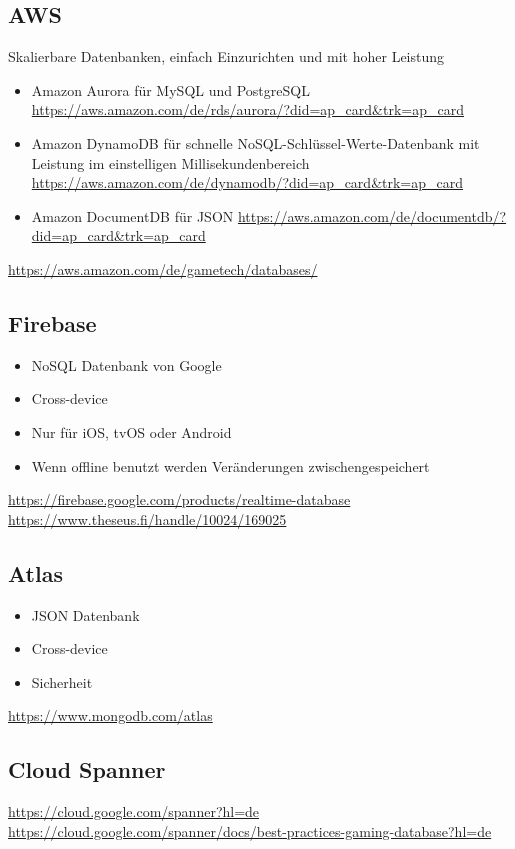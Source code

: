 \subsection{AWS}
Skalierbare Datenbanken, einfach Einzurichten und mit hoher Leistung
\begin{itemize}
    \item Amazon Aurora für MySQL und PostgreSQL \url{https://aws.amazon.com/de/rds/aurora/?did=ap_card&trk=ap_card}
    \item Amazon DynamoDB für schnelle NoSQL-Schlüssel-Werte-Datenbank mit Leistung im einstelligen Millisekundenbereich \url{https://aws.amazon.com/de/dynamodb/?did=ap_card&trk=ap_card}
    \item Amazon DocumentDB für JSON \url{https://aws.amazon.com/de/documentdb/?did=ap_card&trk=ap_card}
\end{itemize}

\url{https://aws.amazon.com/de/gametech/databases/}

\subsection{Firebase}

\begin{itemize}
    \item NoSQL Datenbank von Google
    \item Cross-device
    \item Nur für iOS, tvOS oder Android
    \item Wenn offline benutzt werden Veränderungen zwischengespeichert
\end{itemize}

\url{https://firebase.google.com/products/realtime-database}\\
\url{https://www.theseus.fi/handle/10024/169025}

\subsection{Atlas}

\begin{itemize}
    \item JSON Datenbank
    \item Cross-device
    \item Sicherheit
\end{itemize}

\url{https://www.mongodb.com/atlas}


\subsection{Cloud Spanner}

\url{https://cloud.google.com/spanner?hl=de}\\
\url{https://cloud.google.com/spanner/docs/best-practices-gaming-database?hl=de}